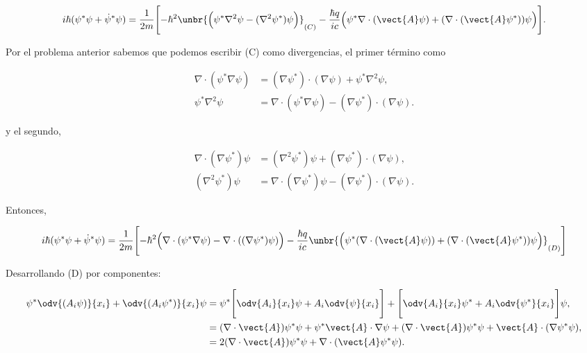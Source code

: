 \documentclass[../main.tex]{subfiles}
\begin{document}
\begin{equation*}
	i\hbar(\psi^{*}\psi + \dot{\psi}^{*}\psi) = \dfrac{1}{2m}\Biggl[-\hbar^{2}\unbr{\Bigl(\psi^{*}\nabla^{2}{\psi} - (\nabla^{2}{\psi^{*}})\psi\Bigr)}_{(C)} - \dfrac{\hbar q}{ic}\Bigl(\psi^{*}\nabla \cdot{(\vect{A}\psi)} + (\nabla \cdot{(\vect{A}\psi^{*})})\psi\Bigr) \Biggr].
\end{equation*}

Por el problema anterior sabemos que podemos escribir (C) como divergencias,
el primer término como

\begin{align*}
	\nabla \cdot{(\psi^{*}\nabla{\psi})} & = (\nabla{\psi^{*}})\cdot(\nabla{\psi}) + \psi^{*}\nabla^{2}{\psi},             \\
	\psi^{*}\nabla^{2}{\psi}             & = \nabla \cdot{(\psi^{*}\nabla{\psi})} - (\nabla{\psi^{*}})\cdot(\nabla{\psi}).
\end{align*}

y el segundo,

\begin{align*}
	\nabla \cdot{(\nabla{\psi^{*}})\psi} & = (\nabla^{2}{\psi^{*}})\psi + (\nabla{\psi^{*}})\cdot(\nabla{\psi}),           \\
	(\nabla^{2}{\psi^{*}})\psi           & = \nabla \cdot{(\nabla{\psi^{*}})\psi} - (\nabla{\psi^{*}})\cdot(\nabla{\psi}).
\end{align*}

Entonces,

\begin{equation*}
	i\hbar(\psi^{*}\psi + \dot{\psi}^{*}\psi) = \dfrac{1}{2m}\Biggl[-\hbar^{2}\Bigl(\nabla \cdot{(\psi^{*}\nabla{\psi})} - \nabla \cdot{((\nabla{\psi^{*}})\psi)}\Bigr) - \dfrac{\hbar q}{ic}\unbr{\Bigl(\psi^{*}(\nabla \cdot{(\vect{A}\psi)}) + (\nabla \cdot{(\vect{A}\psi^{*})})\psi\Bigr)}_{(D)}\Biggr]
\end{equation*}

Desarrollando (D) por componentes:

\begin{align*}
	\psi^{*}\odv{(A_{i}\psi)}{x_{i}} + \odv{(A_{i}\psi^{*})}{x_{i}}\psi & = \psi^{*}\Biggl[\odv{A_{i}}{x_{i}}\psi + A_{i}\odv{\psi}{x_{i}}\Biggr] + \Biggl[\odv{A_{i}}{x_{i}}\psi^{*} + A_{i}\odv{\psi^{*}}{x_{i}}\Biggr]\psi,      \\
	                                                                    & = (\nabla \cdot{\vect{A}})\psi^{*}\psi + \psi^{*}\vect{A}\cdot \nabla{\psi} + (\nabla \cdot{\vect{A}})\psi^{*}\psi + \vect{A}\cdot(\nabla{\psi^{*}\psi}), \\
	                                                                    & = 2(\nabla \cdot{\vect{A}})\psi^{*}\psi + \nabla \cdot{(\vect{A}\psi^{*}\psi)}.
\end{align*}
\end{document}

